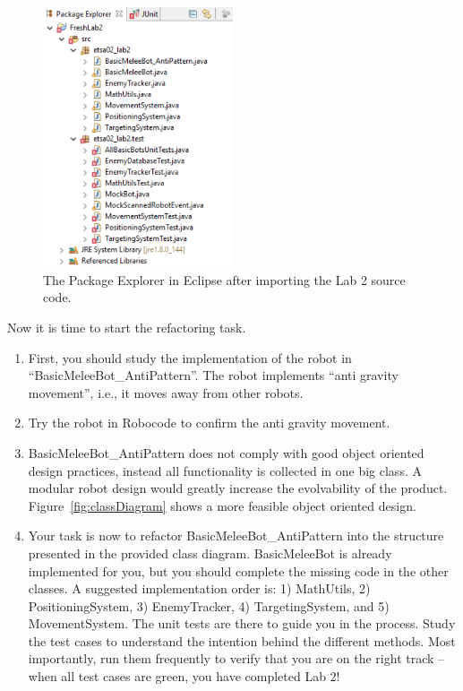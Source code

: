 \documentclass{scrreprt}
\begin{document}
\begin{figure}
\centering
\includegraphics[width=0.5\textwidth]{figures/packageExplorerAfterImport.png}
\caption{The Package Explorer in Eclipse after importing the Lab 2 source code.}
\label{fig:afterImport}
\end{figure}

Now it is time to start the refactoring task. 
\begin{enumerate}
\item First, you should study the implementation of the robot in ``BasicMeleeBot_AntiPattern''. The robot implements ``anti gravity movement'', i.e., it moves away from other robots. 
\item Try the robot in Robocode to confirm the anti gravity movement.
\item BasicMeleeBot_AntiPattern does not comply with good object oriented design practices, instead all functionality is collected in one big class. A modular robot design would greatly increase the evolvability of the product. Figure~\ref{fig:classDiagram} shows a more feasible object oriented design. 
\item Your task is now to refactor BasicMeleeBot_AntiPattern into the structure presented in the provided class diagram. BasicMeleeBot is already implemented for you, but you should complete the missing code in the other classes. A suggested implementation order is: 1) MathUtils, 2) PositioningSystem, 3) EnemyTracker, 4) TargetingSystem, and 5) MovementSystem. The unit tests are there to guide you in the process. Study the test cases to understand the intention behind the different methods. Most importantly, run them frequently to verify that you are on the right track -- when all test cases are green, you have completed Lab 2!
\end{enumerate}
\end{document}
